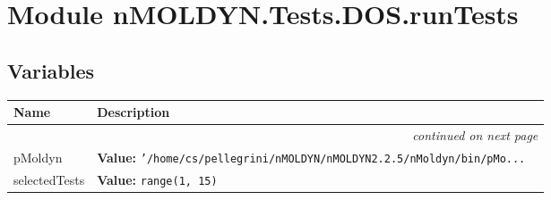 %
%
%


\section{Module nMOLDYN.Tests.DOS.runTests}

    \label{nMOLDYN:Tests:DOS:runTests}


  \subsection{Variables}

    \vspace{-1cm}
\hspace{\varindent}\begin{longtable}{|p{\varnamewidth}|p{\vardescrwidth}|l}
\cline{1-2}
\cline{1-2} \centering \textbf{Name} & \centering \textbf{Description}& \\
\cline{1-2}
\endhead\cline{1-2}\multicolumn{3}{r}{\small\textit{continued on next page}}\\\endfoot\cline{1-2}
\endlastfoot\raggedright p\-M\-o\-l\-d\-y\-n\- & \raggedright \textbf{Value:} 
{\tt '/home/cs/pellegrini/nMOLDYN/nMOLDYN2.2.5/nMoldyn/bin/pMo\texttt{...}}&\\
\cline{1-2}
\raggedright s\-e\-l\-e\-c\-t\-e\-d\-T\-e\-s\-t\-s\- & \raggedright \textbf{Value:} 
{\tt range(1, 15)}&\\
\cline{1-2}
\end{longtable}


